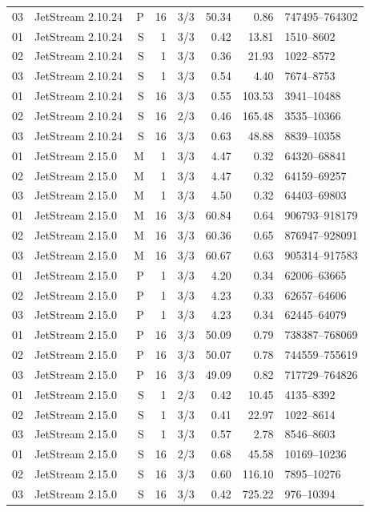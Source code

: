 \begin{longtable}{llrrrrrl}
03 & JetStream 2.10.24 & P & 16 & 3/3 & 50.34 & 0.86 & 747495--764302\\
01 & JetStream 2.10.24 & S & 1 & 3/3 & 0.42 & 13.81 & 1510--8602\\
02 & JetStream 2.10.24 & S & 1 & 3/3 & 0.36 & 21.93 & 1022--8572\\
03 & JetStream 2.10.24 & S & 1 & 3/3 & 0.54 & 4.40 & 7674--8753\\
01 & JetStream 2.10.24 & S & 16 & 3/3 & 0.55 & 103.53 & 3941--10488\\
02 & JetStream 2.10.24 & S & 16 & 2/3 & 0.46 & 165.48 & 3535--10366\\
03 & JetStream 2.10.24 & S & 16 & 3/3 & 0.63 & 48.88 & 8839--10358\\
01 & JetStream 2.15.0 & M & 1 & 3/3 & 4.47 & 0.32 & 64320--68841\\
02 & JetStream 2.15.0 & M & 1 & 3/3 & 4.47 & 0.32 & 64159--69257\\
03 & JetStream 2.15.0 & M & 1 & 3/3 & 4.50 & 0.32 & 64403--69803\\
01 & JetStream 2.15.0 & M & 16 & 3/3 & 60.84 & 0.64 & 906793--918179\\
02 & JetStream 2.15.0 & M & 16 & 3/3 & 60.36 & 0.65 & 876947--928091\\
03 & JetStream 2.15.0 & M & 16 & 3/3 & 60.67 & 0.63 & 905314--917583\\
01 & JetStream 2.15.0 & P & 1 & 3/3 & 4.20 & 0.34 & 62006--63665\\
02 & JetStream 2.15.0 & P & 1 & 3/3 & 4.23 & 0.33 & 62657--64606\\
03 & JetStream 2.15.0 & P & 1 & 3/3 & 4.23 & 0.34 & 62445--64079\\
01 & JetStream 2.15.0 & P & 16 & 3/3 & 50.09 & 0.79 & 738387--768069\\
02 & JetStream 2.15.0 & P & 16 & 3/3 & 50.07 & 0.78 & 744559--755619\\
03 & JetStream 2.15.0 & P & 16 & 3/3 & 49.09 & 0.82 & 717729--764826\\
01 & JetStream 2.15.0 & S & 1 & 2/3 & 0.42 & 10.45 & 4135--8392\\
02 & JetStream 2.15.0 & S & 1 & 3/3 & 0.41 & 22.97 & 1022--8614\\
03 & JetStream 2.15.0 & S & 1 & 3/3 & 0.57 & 2.78 & 8546--8603\\
01 & JetStream 2.15.0 & S & 16 & 2/3 & 0.68 & 45.58 & 10169--10236\\
02 & JetStream 2.15.0 & S & 16 & 3/3 & 0.60 & 116.10 & 7895--10276\\
03 & JetStream 2.15.0 & S & 16 & 3/3 & 0.42 & 725.22 & 976--10394\\
\bottomrule
\end{longtable}
